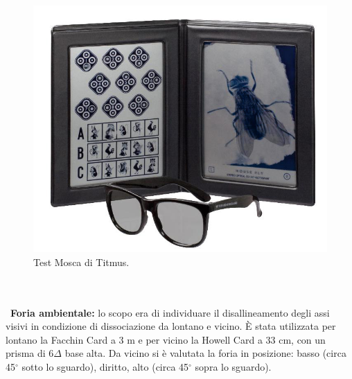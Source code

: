 \begin{figure}[h!]
	\centering
	\includegraphics[scale=0.22]{source/immagini/titmus.jpg}
	\caption[Test Mosca di Titmus]{Test Mosca di Titmus.}
	\label{fig:issuexample}
\end{figure}
\\\ \\\
\textbf{Foria ambientale:} lo scopo era di individuare il disallineamento degli assi visivi in condizione di dissociazione da
lontano e vicino. È stata utilizzata per lontano la Facchin Card a 3 m e per vicino la Howell Card a 33 cm, con un prisma di 6$\Delta$ base alta. Da vicino si è valutata la foria
in posizione: basso (circa 45$^{\circ}$ sotto lo sguardo), diritto, alto (circa 45$^{\circ}$ sopra lo sguardo).

